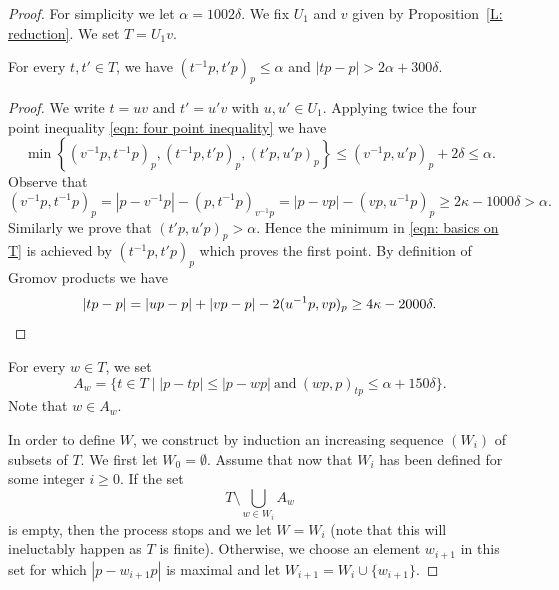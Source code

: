 \begin{proof}
For simplicity we let $\alpha = 1002\delta$.
We fix $U_1$ and $v$ given by Proposition~\ref{L: reduction}.
We set $T=U_1v$.

\begin{lem}
\label{res: basics on T}
For every $t, t' \in T$, we have $(t^{-1}p,t'p)_p\leq \alpha$ and $|tp - p| > 2\alpha + 300\delta$.
\end{lem}

\begin{proof}
We write $t = uv$ and $t' = u'v$ with $u,u' \in U_1$.
Applying twice the four point inequality \eqref{eqn: four point inequality} we have
\begin{equation}
\label{eqn: basics on T}
\min\left\{ (v^{-1}p, t^{-1}p)_p, (t^{-1}p, t'p)_p, (t'p, u'p)_p \right\} \leq (v^{-1}p, u'p)_p + 2\delta \leq \alpha.
\end{equation}
Observe that
\begin{equation*}
(v^{-1}p, t^{-1}p)_p
= |p - v^{-1}p| - (p, t^{-1}p)_{v^{-1}p}
= |p - vp| - (vp, u^{-1}p)_p
\geq 2\kappa - 1000\delta > \alpha.
\end{equation*}
Similarly we prove that $(t'p, u'p)_p > \alpha$.
Hence the minimum in \eqref{eqn: basics on T} is achieved by $(t^{-1}p, t'p)_p$ which proves the first point.
By definition of Gromov products we have
\begin{equation*}
|tp - p| = |up - p| + |vp - p| - 2 (u^{-1}p,vp)_p
\geq 4\kappa - 2000\delta. \qedhere
\end{equation*}
\end{proof}

For every $w \in T$, we set
\begin{equation*}
A_w =\{ t \in T \mid |p - tp| \leq |p -wp|\ \text{and}\ (wp,p)_{tp} \leq \alpha + 150\delta\}.
\end{equation*}
Note that $w \in A_w$.

In order to define $W$, we construct by induction an increasing sequence $(W_i)$ of subsets of $T$.
We first let $W_0 = \emptyset$.
Assume that now that $W_i$ has been defined for some integer $i \geq 0$.
If the set
\begin{equation*}
T \setminus \bigcup_{w \in W_i} A_w
\end{equation*}
is empty, then the process stops and we let $W = W_i$ (note that this will ineluctably happen as $T$ is finite).
Otherwise, we choose an element $w_{i+1}$ in this set for which $|p - w_{i+1}p|$ is maximal and let $W_{i+1} = W_i \cup \{w_{i+1}\}$.


\end{proof}
